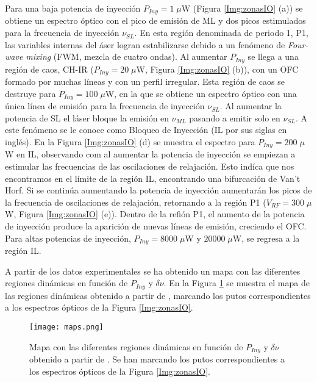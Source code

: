 		Para una baja potencia de inyecci\'on $P_{Iny} = 1 \; \mu$W (Figura \ref{Img:zonasIO} (a)) se obtiene un espectro \'optico con el pico de emisi\'on de ML y dos picos estimulados para la frecuencia de inyecci\'on $\nu_{SL}$. En esta regi\'on denominada de periodo 1, P1, las variables internas del \'aser logran estabilizarse \cite{vainio2006diode} debido a un fen\'omeno de \textit{Four-wave mixing} (FWM, mezcla de cuatro ondas). Al aumentar $P_{Iny}$ se llega a una regi\'on de caos, CH-IR ($P_{Iny} = 20\; \mu$W, Figura \ref{Img:zonasIO} (b)), con un OFC formado por muchas l\'ineas y con un perfil irregular. Esta regi\'on de caos se destruye para $P_{Iny} = 100\;\mu$W, en la que se obtiene un espectro \'optico con una \'unica l\'inea de emisi\'on para la frecuencia de inyecci\'on $\nu_{SL}$. Al aumentar la potencia de SL el l\'aser bloque la emisi\'on en $\nu_{ML}$ pasando a emitir solo en $\nu_{SL}$. A este fen\'omeno se le conoce como Bloqueo de Inyecci\'on (IL por sus siglas en ingl\'es). En la Figura \ref{Img:zonasIO} (d) se muestra el espectro para $P_{Iny} = 200\;\mu$W en IL, observando com al aumentar la potencia de inyecci\'on se empiezan a estimular las frecuencias de las oscilaciones de relajaci\'on. Esto ind\'ica que nos encontramos en el l\'imite de la regi\'on IL, encontrando una bifurcaci\'on de Van't Horf. Si se contin\'ua aumentando la potencia de inyecci\'on aumentar\'an los picos de la frecuencia de oscilaciones de relajaci\'on, retornando a la regi\'on P1 ($V_{RF} = 300\;\mu$W, Figura \ref{Img:zonasIO} (e)). Dentro de la refi\'on P1, el aumento de la potencia de inyecci\'on produce la aparici\'on de nuevas l\'ineas de emisi\'on, creciendo el OFC. Para altas potencias de inyecci\'on, $P_{Iny} = 8000 \;\mu$W y $20000 \;\mu$W, se regresa a la regi\'on IL.

		A partir de los datos experimentales \cite{Chaves19} se ha obtenido un mapa con las diferentes regiones din\'amicas en funci\'on de $P_{Iny}$ y $\delta\nu$. En la Figura \ref{fig:map} se muestra el mapa de las regiones din\'amicas obtenido a partir de \cite{Chaves19}, marcando los putos correspondientes a los espectros \'opticos de la Figura \ref{Img:zonasIO}.

			\begin{figure}[H]
				\centering
				\texttt{[image: maps.png]}
				\caption{\label{fig:map}Mapa con las diferentes regiones din\'amicas en funci\'on de $P_{Iny}$ y $\delta\nu$ obtenido a partir de \cite{Chaves19}. Se han marcando los putos correspondientes a los espectros \'opticos de la Figura \ref{Img:zonasIO}.}
			\end{figure}

